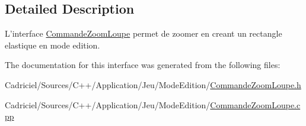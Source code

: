 \subsection{Detailed Description}
L'interface \hyperlink{class_commande_zoom_loupe}{Commande\-Zoom\-Loupe} permet de zoomer en creant un rectangle elastique en mode edition. 

The documentation for this interface was generated from the following files\-:\begin{DoxyCompactItemize}
\item 
Cadriciel/\-Sources/\-C++/\-Application/\-Jeu/\-Mode\-Edition/\hyperlink{_commande_zoom_loupe_8h}{Commande\-Zoom\-Loupe.\-h}\item 
Cadriciel/\-Sources/\-C++/\-Application/\-Jeu/\-Mode\-Edition/\hyperlink{_commande_zoom_loupe_8cpp}{Commande\-Zoom\-Loupe.\-cpp}\end{DoxyCompactItemize}

